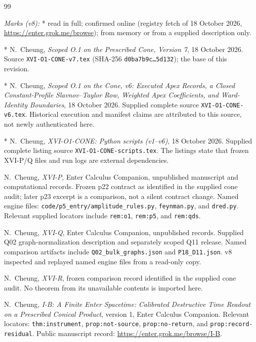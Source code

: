 \documentclass[11pt,a4paper]{article}
\newcommand{\loc}[1]{\nolinkurl{#1}}
\theoremstyle{plain}
\theoremstyle{definition}
\theoremstyle{remark}
\numberwithin{equation}{section}
\begin{document}
\begin{thebibliography}{99}
\item[] \textit{Marks (v8):} * read in full; \ddag{} confirmed online
(registry fetch of 18 October 2026, \url{https://enter.grok.me/browse});
\dag{} from memory or from a supplied description only.

* N.~Cheung,
\emph{Scoped O.1 on the Prescribed Cone, Version 7},
18 October 2026. Source \loc{XVI-O1-CONE-v7.tex}
(SHA-256 \texttt{d0ba7b9c\ldots5d132}); the base of this revision.


* N.~Cheung,
\emph{Scoped O.1 on the Cone, v6:
Executed Apex Records, a Closed Constant-Profile
Slavnov--Taylor Row, Weighted Apex Coefficients,
and Ward-Identity Boundaries},
18 October 2026.
Supplied complete source \loc{XVI-O1-CONE-v6.tex}.
Historical execution and manifest claims are attributed to this
source, not newly authenticated here.

* N.~Cheung,
\emph{XVI-O1-CONE: Python scripts (v1--v6)},
18 October 2026.
Supplied complete listing source
\loc{XVI-O1-CONE-scripts.tex}.
The listings state that frozen XVI-P/Q files and run logs are
external dependencies.

\ddag N.~Cheung,
\emph{XVI-P},
Enter Calculus Companion, unpublished manuscript and computational
records.
Frozen p22 contract as identified in the supplied cone audit;
later p23 excerpt is a comparison, not a silent contract change.
Named engine files:
\loc{code/p5_entry/amplitude_rules.py},
\loc{feynman.py}, and \loc{dred.py}.
Relevant supplied locators include
\loc{rem:o1}, \loc{rem:p5}, and \loc{rem:qds}.

\ddag N.~Cheung,
\emph{XVI-Q},
Enter Calculus Companion, unpublished records.
Supplied Q02 graph-normalization description and separately
scoped Q11 release.
Named comparison artifacts include
\loc{Q02_bulk_graphs.json} and \loc{P18_D11.json}.
v8 inspected and replayed named engine files from a read-only copy.

\dag N.~Cheung,
\emph{XVI-R},
frozen comparison record identified in the supplied cone audit.
No theorem from its unavailable contents is imported here.

\ddag N.~Cheung,
\emph{I-B: A Finite Enter Spacetime:
Calibrated Destructive Time Readout on a Prescribed Conical Product},
version 1, Enter Calculus Companion.
Relevant locators:
\loc{thm:instrument}, \loc{prop:not-source},
\loc{prop:no-return}, and \loc{prop:record-residual}.
Public manuscript record:
\url{https://enter.grok.me/browse/I-B}.


\end{thebibliography}
\end{document}
